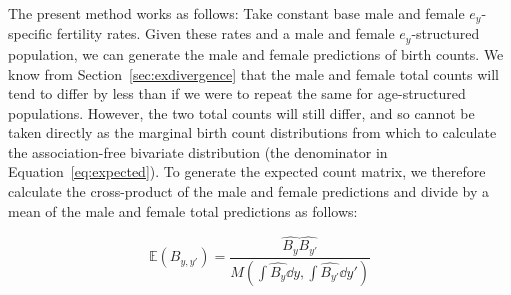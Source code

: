 
The present method works as follows: Take constant base male and female
$e_y$-specific fertility rates. Given these rates and a male and female
$e_y$-structured population, we can generate the male and female predictions of
birth counts. We know from Section~\ref{sec:exdivergence} that the male and
female total counts will tend to differ by less than if we were to repeat the
same for age-structured populations. However, the two total counts will still
differ, and so cannot be taken directly as the marginal birth count distributions from
which to calculate the association-free bivariate distribution (the denominator
in Equation~\eqref{eq:expected}). To generate the expected count matrix, we
therefore calculate the cross-product of the male and female predictions and
divide by a mean of the male and female total predictions as follows:

\begin{equation}
\mathbb{E}(B_{y,y'}) = \frac{\widehat{B_y} \widehat{B_{y'}}}{M(\int \widehat{B_y} \dd y,
\int \widehat{B_{y'}} \dd y')}
\end{equation}













